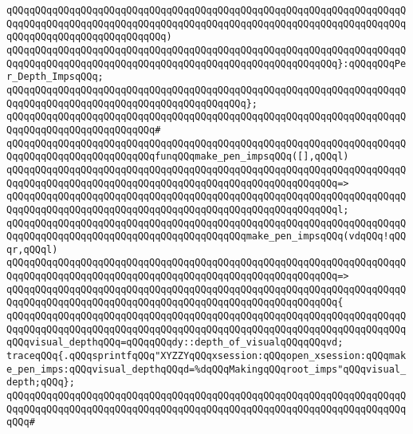 \verb|qQQqqQQqqQQqqQQqqQQqqQQqqQQqqQQqqQQqqQQqqQQqqQQqqQQqqQQqqQQqqQQqqQQqqQQqqQQqqQQqqQQqqQQqqQQqqQQqqQQqqQQqqQQqqQQqqQQqqQQqqQQqqQQqqQQqqQQqqQQqqQQqqQQqqQQqqQQqqQQqqQQqqQQq)|\newline
\verb|qQQqqQQqqQQqqQQqqQQqqQQqqQQqqQQqqQQqqQQqqQQqqQQqqQQqqQQqqQQqqQQqqQQqqQQqqQQqqQQqqQQqqQQqqQQqqQQqqQQqqQQqqQQqqQQqqQQqqQQqqQQqqQQq}:qQQqqQQqPer_Depth_ImpsqQQq;|\newline
\verb|qQQqqQQqqQQqqQQqqQQqqQQqqQQqqQQqqQQqqQQqqQQqqQQqqQQqqQQqqQQqqQQqqQQqqQQqqQQqqQQqqQQqqQQqqQQqqQQqqQQqqQQqqQQqqQQq};|\newline
\verb|qQQqqQQqqQQqqQQqqQQqqQQqqQQqqQQqqQQqqQQqqQQqqQQqqQQqqQQqqQQqqQQqqQQqqQQqqQQqqQQqqQQqqQQqqQQqqQQq#|\newline
\verb|qQQqqQQqqQQqqQQqqQQqqQQqqQQqqQQqqQQqqQQqqQQqqQQqqQQqqQQqqQQqqQQqqQQqqQQqqQQqqQQqqQQqqQQqqQQqqQQqfunqQQqmake_pen_impsqQQq([],qQQql)|\newline
\verb|qQQqqQQqqQQqqQQqqQQqqQQqqQQqqQQqqQQqqQQqqQQqqQQqqQQqqQQqqQQqqQQqqQQqqQQqqQQqqQQqqQQqqQQqqQQqqQQqqQQqqQQqqQQqqQQqqQQqqQQqqQQqqQQq=>|\newline
\verb|qQQqqQQqqQQqqQQqqQQqqQQqqQQqqQQqqQQqqQQqqQQqqQQqqQQqqQQqqQQqqQQqqQQqqQQqqQQqqQQqqQQqqQQqqQQqqQQqqQQqqQQqqQQqqQQqqQQqqQQqqQQqqQQql;|\newline
\newline
\verb|qQQqqQQqqQQqqQQqqQQqqQQqqQQqqQQqqQQqqQQqqQQqqQQqqQQqqQQqqQQqqQQqqQQqqQQqqQQqqQQqqQQqqQQqqQQqqQQqqQQqqQQqqQQqqQQqmake_pen_impsqQQq(vdqQQq!qQQqr,qQQql)|\newline
\verb|qQQqqQQqqQQqqQQqqQQqqQQqqQQqqQQqqQQqqQQqqQQqqQQqqQQqqQQqqQQqqQQqqQQqqQQqqQQqqQQqqQQqqQQqqQQqqQQqqQQqqQQqqQQqqQQqqQQqqQQqqQQqqQQq=>|\newline
\verb|qQQqqQQqqQQqqQQqqQQqqQQqqQQqqQQqqQQqqQQqqQQqqQQqqQQqqQQqqQQqqQQqqQQqqQQqqQQqqQQqqQQqqQQqqQQqqQQqqQQqqQQqqQQqqQQqqQQqqQQqqQQqqQQq{|\newline
\verb|qQQqqQQqqQQqqQQqqQQqqQQqqQQqqQQqqQQqqQQqqQQqqQQqqQQqqQQqqQQqqQQqqQQqqQQqqQQqqQQqqQQqqQQqqQQqqQQqqQQqqQQqqQQqqQQqqQQqqQQqqQQqqQQqqQQqqQQqqQQqqQQqvisual_depthqQQq=qQQqqQQqdy::depth_of_visualqQQqqQQqvd;|\newline
\verb|traceqQQq{.qQQqsprintfqQQq"XYZZYqQQqxsession:qQQqopen_xsession:qQQqmake_pen_imps:qQQqvisual_depthqQQqd=%dqQQqMakingqQQqroot_imps"qQQqvisual_depth;qQQq};|\newline
\verb|qQQqqQQqqQQqqQQqqQQqqQQqqQQqqQQqqQQqqQQqqQQqqQQqqQQqqQQqqQQqqQQqqQQqqQQqqQQqqQQqqQQqqQQqqQQqqQQqqQQqqQQqqQQqqQQqqQQqqQQqqQQqqQQqqQQqqQQqqQQqqQQq#|\newline
